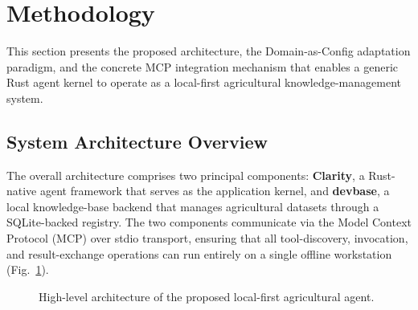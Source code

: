 \section{Methodology}
\label{sec:methodology}

This section presents the proposed architecture, the Domain-as-Config adaptation paradigm, and the concrete MCP integration mechanism that enables a generic Rust agent kernel to operate as a local-first agricultural knowledge-management system.

\subsection{System Architecture Overview}

The overall architecture comprises two principal components: \textbf{Clarity}, a Rust-native agent framework that serves as the application kernel, and \textbf{devbase}, a local knowledge-base backend that manages agricultural datasets through a SQLite-backed registry. The two components communicate via the Model Context Protocol (MCP) over stdio transport, ensuring that all tool-discovery, invocation, and result-exchange operations can run entirely on a single offline workstation (Fig.~\ref{fig:architecture}).

\begin{figure}[htbp]
\centering
{}
\caption{High-level architecture of the proposed local-first agricultural agent.}
\label{fig:architecture}
\end{figure}

